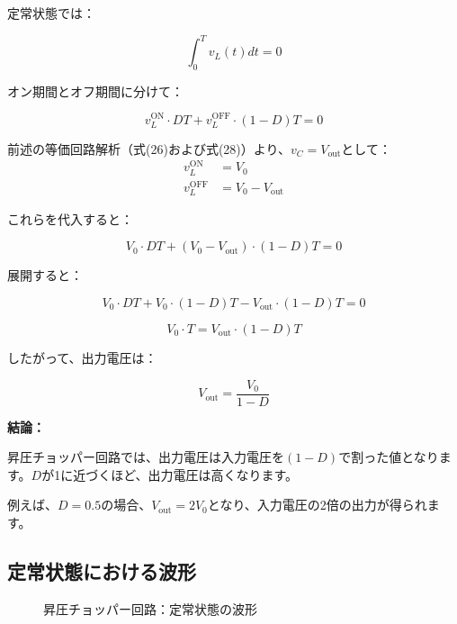 定常状態では：

\begin{equation}
\int_0^T v_L(t)dt = 0
\end{equation}

オン期間とオフ期間に分けて：

\begin{equation}
v_L^{\text{ON}} \cdot DT + v_L^{\text{OFF}} \cdot (1-D)T = 0
\end{equation}

前述の等価回路解析（式(26)および式(28)）より、$v_C = V_{\text{out}}$として：
\begin{align}
v_L^{\text{ON}} &= V_0 \\
v_L^{\text{OFF}} &= V_0 - V_{\text{out}}
\end{align}

これらを代入すると：

\begin{equation}
V_0 \cdot DT + (V_0 - V_{\text{out}}) \cdot (1-D)T = 0
\end{equation}

展開すると：

\begin{equation}
V_0 \cdot DT + V_0 \cdot (1-D)T - V_{\text{out}} \cdot (1-D)T = 0
\end{equation}

\begin{equation}
V_0 \cdot T = V_{\text{out}} \cdot (1-D)T
\end{equation}

したがって、出力電圧は：

\begin{equation}
\boxed{V_{\text{out}} = \frac{V_0}{1-D}}
\end{equation}

\textbf{結論：}

昇圧チョッパー回路では、出力電圧は入力電圧を$(1-D)$で割った値となります。$D$が1に近づくほど、出力電圧は高くなります。

例えば、$D = 0.5$の場合、$V_{\text{out}} = 2V_0$となり、入力電圧の2倍の出力が得られます。

\subsection{定常状態における波形}

\begin{figure}[H]
\centering
{}
\caption{昇圧チョッパー回路：定常状態の波形}
\label{fig:ch05_boost_waveforms}
\end{figure}

